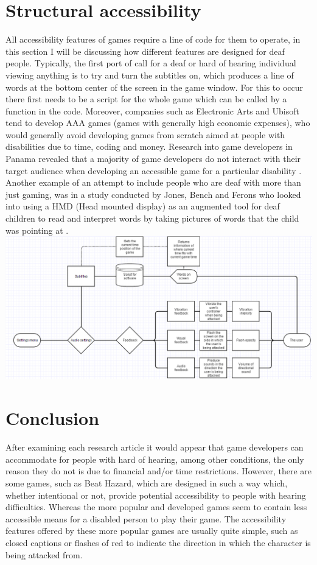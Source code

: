 \documentclass{scrartcl}
\begin{document}
\section{Structural accessibility}
All accessibility features of games require a line of code for them to operate, in this section I will be discussing how different features are designed for deaf people.
Typically, the first port of call for a deaf or hard of hearing individual viewing anything is to try and turn the subtitles on, which produces a line of words at the bottom center of the screen in the game window. For this to occur there first needs to be a script for the whole game which can be called by a function in the code. Moreover, companies such as Electronic Arts and Ubisoft tend to develop AAA games (games with generally high economic expenses), who would generally avoid developing games from scratch aimed at people with disabilities due to time, coding and money. Research into game developers in Panama revealed that a majority of game developers do not interact with their target audience when developing an accessible game for a particular disability \cite {moreno}. Another example of an attempt to include people who are deaf with more than just gaming, was in a study conducted by Jones, Bench and Ferons who looked into using a HMD (Head mounted display) as an augmented tool for deaf children to read and interpret words by taking pictures of words that the child was pointing at \cite {Jones}.
\includegraphics [scale=0.5]{gliffy}

\section{Conclusion}
After examining each research article it would appear that game developers can accommodate for people with hard of hearing, among other conditions, the only reason they do not is due to
financial and/or time restrictions. However, there are some games, such as Beat Hazard, which are designed in such a way which, whether intentional or not, provide potential accessibility to people with hearing difficulties. Whereas the more popular and developed games seem to contain less accessible means for a disabled person to play their game. The accessibility features offered by these more popular games are usually quite simple, such as closed captions or flashes of red to indicate the direction in which the character is being attacked from.



\end{document}
